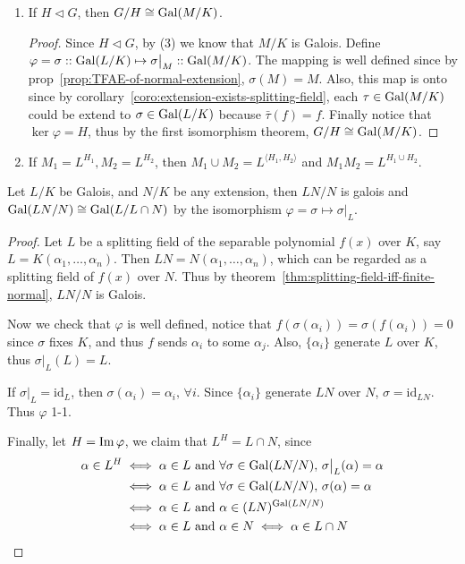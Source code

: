 \begin{theorem}
\begin{enumerate}[(\arabic*)]
    \item If $H \lhd G$, then $G / H \cong \operatorname{Gal}(M/K)$.
      \begin{proof}
        Since $H \lhd G$, by (3) we know that $M/K$ is Galois. Define $\varphi = \sigma :: \operatorname{Gal}(L/K)
        \mapsto \sigma\big|_M :: \operatorname{Gal}(M/K)$. The mapping is well defined
        since by prop~\ref{prop:TFAE-of-normal-extension}, $\sigma(M) = M$.
        Also, this map is onto since by corollary~\ref{coro:extension-exists-splitting-field},
        each $\tau \in \operatorname{Gal}(M/K)$ could be extend to $\sigma \in \operatorname{Gal}(L/K)$ because
        $\bar\tau(f) = f$. Finally notice that $\ker \varphi = H$, thus by the
        first isomorphism theorem, $G/H \cong \operatorname{Gal}(M/K)$.
      \end{proof}

    \item If $M_1 = L^{H_1}, M_2 = L^{H_2}$, then $M_1 \cup M_2 = L^{\langle H_1, H_2 \rangle}$ and
      $M_1 M_2 = L^{H_1 \cup H_2}$.
  \end{enumerate}
\end{theorem}

\begin{theorem}
  Let $L/K$ be Galois, and $N/K$ be any extension, then $LN / N$ is galois and
  $\operatorname{Gal}({LN}/{N}) \cong \operatorname{Gal}({L}/{L \cap N})$ by the isomorphism
  $\varphi = \sigma \mapsto \sigma\big|_L$.

  \begin{proof}
    Let $L$ be a splitting field of the separable polynomial $f(x)$ over $K$,
    say $L = K(\alpha_1, \dots, \alpha_n)$. Then $LN = N(\alpha_1, \dots, \alpha_n)$,
    which can be regarded as a splitting field of $f(x)$ over $N$.
    Thus by theorem~\ref{thm:splitting-field-iff-finite-normal}, $LN/N$ is Galois.

    Now we check that $\varphi$ is well defined, notice that $f(\sigma(\alpha_i))
    = \sigma(f(\alpha_i)) = 0$ since $\sigma$ fixes $K$, and thus $f$ sends $\alpha_i$
    to some $\alpha_j$. Also, $\{ \alpha_i \}$ generate $L$ over $K$, thus $\sigma\big|_L(L) = L$.

    If $\sigma\big|_L = \text{id}_L$, then $\sigma(\alpha_i) = \alpha_i, \, \forall i$.
    Since $\{\alpha_i\}$ generate $LN$ over $N$, $\sigma = \text{id}_{LN}$. Thus $\varphi$ 1-1.

    Finally, let $H = \operatorname{Im} \varphi$, we claim that $L^H = L \cap N$, since
      \begin{align*}
        \alpha \in L^H &\iff \alpha \in L \text{ and } \forall \sigma \in \operatorname{Gal}(LN/N),\, \sigma\big|_L(\alpha) = \alpha \\
        &\iff \alpha \in L \text{ and } \forall \sigma \in \operatorname{Gal}(LN/N),\, \sigma(\alpha) = \alpha \\
        &\iff \alpha \in L \text{ and } \alpha \in (LN)^{\operatorname{Gal}(LN/N)} \\
        &\iff \alpha \in L \text{ and } \alpha \in N \iff \alpha \in L \cap N
      \end{align*}
  \end{proof}
\end{theorem}

